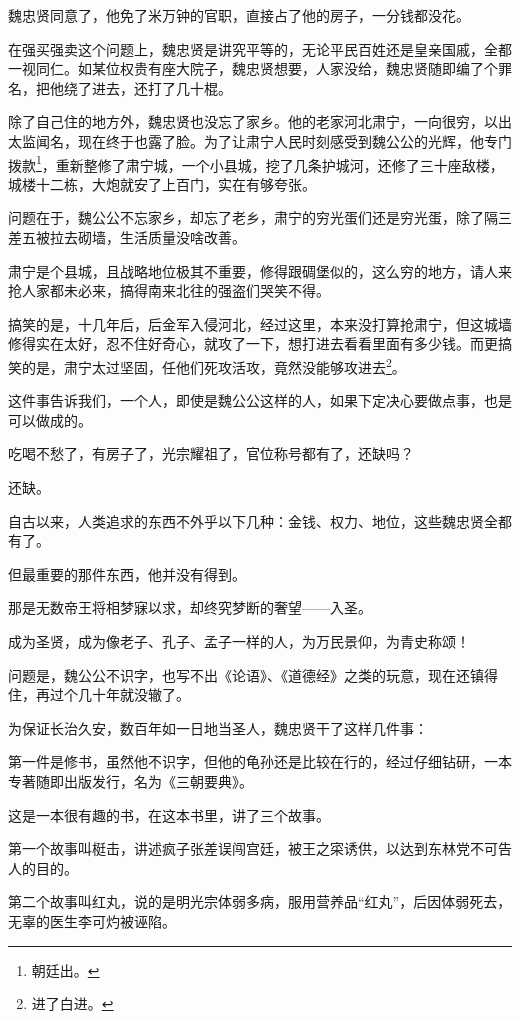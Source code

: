 \begin{multicols}{\theparacolNo}
		魏忠贤同意了，他免了米万钟的官职，直接占了他的房子，一分钱都没花。

		在强买强卖这个问题上，魏忠贤是讲究平等的，无论平民百姓还是皇亲国戚，全都一视同仁。如某位权贵有座大院子，魏忠贤想要，人家没给，魏忠贤随即编了个罪名，把他绕了进去，还打了几十棍。

		除了自己住的地方外，魏忠贤也没忘了家乡。他的老家河北肃宁，一向很穷，以出太监闻名，现在终于也露了脸。为了让肃宁人民时刻感受到魏公公的光辉，他专门拨款\footnote{朝廷出。}，重新整修了肃宁城，一个小县城，挖了几条护城河，还修了三十座敌楼，城楼十二栋，大炮就安了上百门，实在有够夸张。

		问题在于，魏公公不忘家乡，却忘了老乡，肃宁的穷光蛋们还是穷光蛋，除了隔三差五被拉去砌墙，生活质量没啥改善。

		肃宁是个县城，且战略地位极其不重要，修得跟碉堡似的，这么穷的地方，请人来抢人家都未必来，搞得南来北往的强盗们哭笑不得。

		搞笑的是，十几年后，后金军入侵河北，经过这里，本来没打算抢肃宁，但这城墙修得实在太好，忍不住好奇心，就攻了一下，想打进去看看里面有多少钱。而更搞笑的是，肃宁太过坚固，任他们死攻活攻，竟然没能够攻进去\footnote{进了白进。}。

		这件事告诉我们，一个人，即使是魏公公这样的人，如果下定决心要做点事，也是可以做成的。

		吃喝不愁了，有房子了，光宗耀祖了，官位称号都有了，还缺吗？

		还缺。

		自古以来，人类追求的东西不外乎以下几种：金钱、权力、地位，这些魏忠贤全都有了。

		但最重要的那件东西，他并没有得到。

		那是无数帝王将相梦寐以求，却终究梦断的奢望——入圣。

		成为圣贤，成为像老子、孔子、孟子一样的人，为万民景仰，为青史称颂！

		问题是，魏公公不识字，也写不出《论语》、《道德经》之类的玩意，现在还镇得住，再过个几十年就没辙了。

		为保证长治久安，数百年如一日地当圣人，魏忠贤干了这样几件事：

		第一件是修书，虽然他不识字，但他的龟孙还是比较在行的，经过仔细钻研，一本专著随即出版发行，名为《三朝要典》。

		这是一本很有趣的书，在这本书里，讲了三个故事。

		第一个故事叫梃击，讲述疯子张差误闯宫廷，被王之寀诱供，以达到东林党不可告人的目的。

		第二个故事叫红丸，说的是明光宗体弱多病，服用营养品“红丸”，后因体弱死去，无辜的医生李可灼被诬陷。


\end{multicols}
